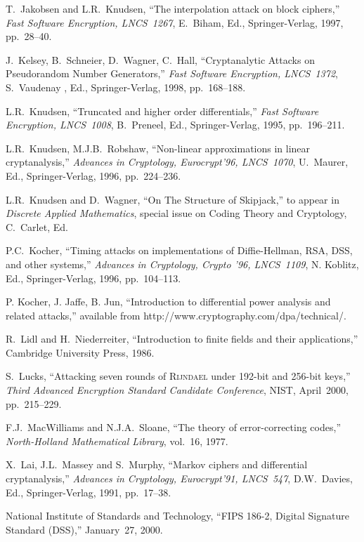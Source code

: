 \documentclass{llncs}
\begin{document}
\begin{thebibliography}{99}
T.~Jakobsen and L.R.~Knudsen,
``The interpolation attack on block ciphers,'' \emph{Fast Software
Encryption, LNCS~1267}, E.~Biham, Ed., Springer-Verlag, 1997,
pp.~28--40.

J.~Kelsey, B.~Schneier, D.~Wagner,
C.~Hall, ``Cryptanalytic Attacks on Pseudorandom Number
Generators,'' \emph{Fast Software Encryption, LNCS~1372},
S.~Vaudenay , Ed., Springer-Verlag, 1998, pp.~168--188.

L.R.~Knudsen, ``Truncated and higher order
differentials,'' \emph{Fast Software Encryption, LNCS~1008},
B.~Preneel, Ed., Springer-Verlag, 1995, pp.~196--211.

 L.R.~Knudsen, M.J.B.~Robshaw,
``Non-linear approximations in linear cryptanalysis,''
\emph{Advances in Cryptology,
Eurocrypt'96, LNCS~1070}, U.~Maurer, Ed., Springer-Verlag, 1996,
pp.~224--236.

L.R.~Knudsen and D.~Wagner,
``On The Structure of Skipjack,'' to appear in \emph{Discrete
Applied Mathematics}, special issue on Coding Theory and
Cryptology, C.~Carlet, Ed.

P.C.~Kocher, ``Timing attacks on implementations of {Diffie-Hellman},
{RSA}, {DSS}, and other systems,'' \emph{Advances in Cryptology, Crypto '96, LNCS~1109},
N. Koblitz, Ed., Springer-Verlag, 1996, pp.~104--113.

 P. Kocher, J. Jaffe, B. Jun, ``Introduction to differential
power analysis and related attacks,'' available from
http://www.cryptography.com/dpa/technical/.

R.~Lidl and H.~Niederreiter,
``Introduction to finite fields and their applications,''
Cambridge University Press, 1986.

S.~Lucks, ``Attacking seven rounds of \textsc{\mbox{Rijndael}}
under 192-bit and 256-bit keys,'' \emph{Third Advanced Encryption
Standard Candidate Conference}, NIST, April~2000, pp.~215--229.

F.J.~MacWilliams and N.J.A.~Sloane,
``The theory of error-correcting codes,'' \emph{North-Holland
Mathematical Library}, vol.~16, 1977.

X.~Lai, J.L.~Massey and S.~Murphy, ``Markov ciphers
and differential cryptanalysis,'' \emph{Advances in Cryptology,
Eurocrypt'91, LNCS~547}, D.W.~Davies, Ed., Springer-Verlag, 1991,
pp.~17--38.

National Institute of Standards and Technology,
``FIPS 186-2, Digital Signature Standard (DSS),'' January~27,
2000.


\end{thebibliography}
\end{document}
